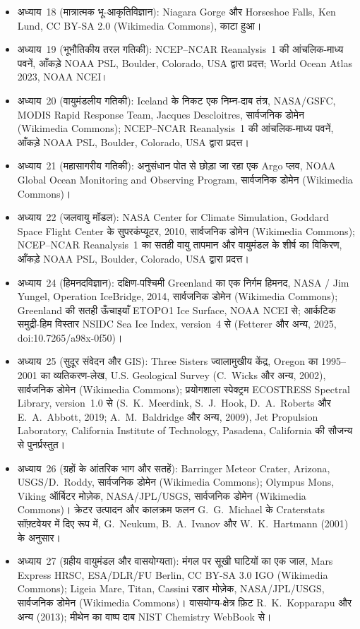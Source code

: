 \begin{itemize}
  \item अध्याय~18 (मात्रात्मक भू-आकृतिविज्ञान): Niagara Gorge और Horseshoe Falls, Ken Lund, CC BY-SA 2.0 (Wikimedia Commons), काटा हुआ।
  \item अध्याय~19 (भूभौतिकीय तरल गतिकी): NCEP--NCAR Reanalysis~1 की आंचलिक-माध्य पवनें, आँकड़े NOAA PSL, Boulder, Colorado, USA द्वारा प्रदत्त; World Ocean Atlas 2023, NOAA NCEI।
  \item अध्याय~20 (वायुमंडलीय गतिकी): Iceland के निकट एक निम्न-दाब तंत्र, NASA/GSFC, MODIS Rapid Response Team, Jacques Descloitres, सार्वजनिक डोमेन (Wikimedia Commons); NCEP--NCAR Reanalysis~1 की आंचलिक-माध्य पवनें, आँकड़े NOAA PSL, Boulder, Colorado, USA द्वारा प्रदत्त।
  \item अध्याय~21 (महासागरीय गतिकी): अनुसंधान पोत से छोड़ा जा रहा एक Argo प्लव, NOAA Global Ocean Monitoring and Observing Program, सार्वजनिक डोमेन (Wikimedia Commons)।
  \item अध्याय~22 (जलवायु मॉडल): NASA Center for Climate Simulation, Goddard Space Flight Center के सुपरकंप्यूटर, 2010, सार्वजनिक डोमेन (Wikimedia Commons); NCEP--NCAR Reanalysis~1 का सतही वायु तापमान और वायुमंडल के शीर्ष का विकिरण, आँकड़े NOAA PSL, Boulder, Colorado, USA द्वारा प्रदत्त।
  \item अध्याय~24 (हिमनदविज्ञान): दक्षिण-पश्चिमी Greenland का एक निर्गम हिमनद, NASA / Jim Yungel, Operation IceBridge, 2014, सार्वजनिक डोमेन (Wikimedia Commons); Greenland की सतही ऊँचाइयाँ ETOPO1 Ice Surface, NOAA NCEI से; आर्कटिक समुद्री-हिम विस्तार NSIDC Sea Ice Index, version~4 से (Fetterer और अन्य, 2025, doi:10.7265/a98x-0f50)।
  \item अध्याय~25 (सुदूर संवेदन और GIS): Three Sisters ज्वालामुखीय केंद्र, Oregon का 1995--2001 का व्यतिकरण-लेख, U.S. Geological Survey (C.~Wicks और अन्य, 2002), सार्वजनिक डोमेन (Wikimedia Commons); प्रयोगशाला स्पेक्ट्रम ECOSTRESS Spectral Library, version~1.0 से (S.~K.~Meerdink, S.~J.~Hook, D.~A.~Roberts और E.~A.~Abbott, 2019; A.~M.~Baldridge और अन्य, 2009), Jet Propulsion Laboratory, California Institute of Technology, Pasadena, California की सौजन्य से पुनर्प्रस्तुत।
  \item अध्याय~26 (ग्रहों के आंतरिक भाग और सतहें): Barringer Meteor Crater, Arizona, USGS/D.~Roddy, सार्वजनिक डोमेन (Wikimedia Commons); Olympus Mons, Viking ऑर्बिटर मोज़ेक, NASA/\allowbreak JPL/\allowbreak USGS, सार्वजनिक डोमेन (Wikimedia Commons)। क्रेटर उत्पादन और कालक्रम फलन G.~G.~Michael के Craterstats सॉफ़्टवेयर में दिए रूप में, G.~Neukum, B.~A.~Ivanov और W.~K.~Hartmann (2001) के अनुसार।
  \item अध्याय~27 (ग्रहीय वायुमंडल और वासयोग्यता): मंगल पर सूखी घाटियों का एक जाल, Mars Express HRSC, ESA/\allowbreak DLR/\allowbreak FU Berlin, CC BY-SA 3.0 IGO (Wikimedia Commons); Ligeia Mare, Titan, Cassini रडार मोज़ेक, NASA/\allowbreak JPL/\allowbreak USGS, सार्वजनिक डोमेन (Wikimedia Commons)। वासयोग्य-क्षेत्र फ़िट R.~K.~Kopparapu और अन्य (2013); मीथेन का वाष्प दाब NIST Chemistry WebBook से।

\end{itemize}
